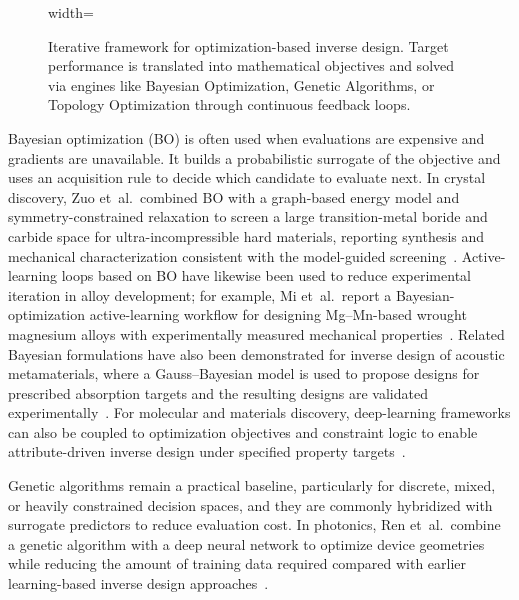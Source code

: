 \begin{figure}[!htbp]
  \centering
  \begin{adjustbox}{width=\linewidth}
      
  \end{adjustbox}
  \caption[Optimization-Based Inverse Design Framework]{Iterative framework for optimization-based inverse design. Target performance is translated into mathematical objectives and solved via engines like Bayesian Optimization, Genetic Algorithms, or Topology Optimization through continuous feedback loops.}
  \label{fig:optimization_based_inverse}
\end{figure}


Bayesian optimization (BO) is often used when evaluations are expensive and gradients are unavailable. It builds a probabilistic surrogate of the objective and uses an acquisition rule to decide which candidate to evaluate next. In crystal discovery, Zuo et~al.\ combined BO with a graph-based energy model and symmetry-constrained relaxation to screen a large transition-metal boride and carbide space for ultra-incompressible hard materials, reporting synthesis and mechanical characterization consistent with the model-guided screening~\cite{Zuo2021_MaterialsToday}. Active-learning loops based on BO have likewise been used to reduce experimental iteration in alloy development; for example, Mi et~al.\ report a Bayesian-optimization active-learning workflow for designing Mg--Mn-based wrought magnesium alloys with experimentally measured mechanical properties~\cite{Mi2024_JMagAlloys}. Related Bayesian formulations have also been demonstrated for inverse design of acoustic metamaterials, where a Gauss--Bayesian model is used to propose designs for prescribed absorption targets and the resulting designs are validated experimentally~\cite{Zheng2020_JAP}. For molecular and materials discovery, deep-learning frameworks can also be coupled to optimization objectives and constraint logic to enable attribute-driven inverse design under specified property targets~\cite{Tagade2019_NPJCM}.


Genetic algorithms remain a practical baseline, particularly for discrete, mixed, or heavily constrained decision spaces, and they are commonly hybridized with surrogate predictors to reduce evaluation cost. In photonics, Ren et~al.\ combine a genetic algorithm with a deep neural network to optimize device geometries while reducing the amount of training data required compared with earlier learning-based inverse design approaches~\cite{Ren2021_PhotonicsResearch}.

